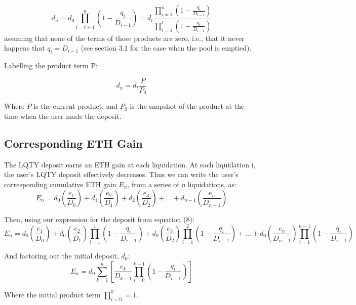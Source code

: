 \documentclass[reqno]{article}
\begin{document}
\begin{equation} 
    d_n=d_0\prod^n_{i=t+1}{\left(1-\frac{q_i}{D_{i-1}}\right)}=d_t\frac{\displaystyle\prod^n_{i=1}{\left(1-\frac{q_i}{D_{i-1}}\right)}}{\displaystyle\prod^t_{i=1}\left(1-\frac{q_i}{D_{i-1}}\right)}
\end{equation}
assuming that none of the terms of those products are zero, i.e., that it never
happens that $q_i = D_{i-1}$ (see section 3.1 for the case when the pool is emptied).

\bigskip
Labelling the product term P:

\begin{equation} 
d_n=d_t\frac{P}{P_0}
\end{equation}

\bigskip
Where $P$ is the current product, and {$P_0$} is the snapshot of the product at the time when the user made the deposit.

\bigskip
\subsection{Corresponding ETH Gain}

\bigskip
The LQTY deposit earns an ETH gain at each liquidation.
At each liquidation i, the user’s LQTY deposit effectively decreases. Thus we can write the
user’s corresponding cumulative ETH gain $E_{n}$, from a series of \textit{n} liquidations, as:
\begin{equation} 
E_n=d_0\left(\frac{e_1}{D_0}\right)+d_1\left(\frac{e_2}{D_1}\right)+d_2\left(\frac{e_3}{D_2}\right)+...+d_{n-1}\left(\frac{e_n}{D_{n-1}}\right)
\end{equation}

\bigskip
Then, using our expression for the deposit from equation (8):
\begin{equation} 
E_n=d_0\left(\frac{e_1}{D_0}\right)+d_0\left(\frac{e_2}{D_1}\right)\prod^1_{i=1}\left(1-\frac{q_i}{D_{i-1}}\right)+d_0\left(\frac{e_3}{D_2}\right)\prod^2_{i=1}\left(1-\frac{q_i}{D_{i-1}}\right)+...+d_0\left(\frac{e_n}{D_{n-1}}\right)\prod^{n-1}_{i=1}\left(1-\frac{q_i}{D_{i-1}}\right)
\end{equation}

\bigskip
And factoring out the initial deposit, $d_0$:
\begin{equation} 
    E_n=d_0\sum^n_{k=1}\left[\frac{e_k}{D_{k-1}}\prod^{k-1}_{i=0}\left(1-\frac{q_i}{D_{i-1}}\right)\right]
\end{equation}

\bigskip
Where the initial product term $\displaystyle\prod^0_{i=0}=1$.
\end{document}
